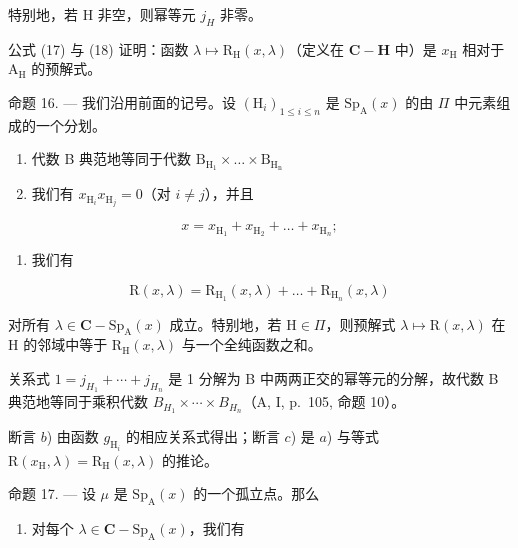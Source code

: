 特别地，若 H 非空，则幂等元 \(j_{H}\) 非零。

公式 (17) 与 (18) 证明：函数 \(\lambda \mapsto \mathrm{R}_{\mathrm{H}}(x,\lambda)\)（定义在 \(\mathbf{C} - \mathbf{H}\) 中）是 \(x_{\mathrm{H}}\) 相对于 \(\mathrm{A_H}\) 的预解式。

命题 16. --- 我们沿用前面的记号。设 \((\mathrm{H}_{i})_{1\leqslant i\leqslant n}\) 是 \(\mathrm{Sp}_{\mathrm{A}}(x)\) 的由 \(\Pi\) 中元素组成的一个分划。

\begin{enumerate}
\def\labelenumi{\alph{enumi})}
\item
  代数 B 典范地等同于代数 \(\mathrm{B_{H_1}}\times \dots \times \mathrm{B_{H_n}}\)
\item
  我们有 \(x_{\mathrm{H}_i}x_{\mathrm{H}_j} = 0\)（对 \(i\neq j\)），并且
\end{enumerate}

\[
x = x _ {\mathrm{H} _ {1}} + x _ {\mathrm{H} _ {2}} + \dots + x _ {\mathrm{H} _ {n}};
\]

\begin{enumerate}
\def\labelenumi{\alph{enumi})}
\setcounter{enumi}{2}
\tightlist
\item
  我们有
\end{enumerate}

\[
\mathrm{R} (x, \lambda) = \mathrm{R} _ {\mathrm{H} _ {1}} (x, \lambda) + \dots + \mathrm{R} _ {\mathrm{H} _ {n}} (x, \lambda)\tag{19}
\]

对所有 \(\lambda\in\mathbf{C}-\mathrm{Sp}_{\mathrm{A}}(x)\) 成立。特别地，若 \(\mathrm{H}\in\Pi\)，则预解式 \(\lambda\mapsto\mathrm{R}(x,\lambda)\) 在 \(\mathrm{H}\) 的邻域中等于 \(\mathrm{R}_{\mathrm{H}}(x,\lambda)\) 与一个全纯函数之和。

关系式 \(1 = j_{H_{1}} + \cdots + j_{H_{n}}\) 是 1 分解为 B 中两两正交的幂等元的分解，故代数 B 典范地等同于乘积代数 \(B_{H_{1}} \times \cdots \times B_{H_{n}}\)（A, I, p.~105, 命题 10）。

断言 \(b\)) 由函数 \(g_{\mathrm{H}_i}\) 的相应关系式得出；断言 \(c\)) 是 \(a\)) 与等式 \(\mathrm{R}(x_{\mathrm{H}},\lambda) = \mathrm{R}_{\mathrm{H}}(x,\lambda)\) 的推论。

命题 17. --- 设 \(\mu\) 是 \(\mathrm{Sp}_{\mathrm{A}}(x)\) 的一个孤立点。那么

\begin{enumerate}
\def\labelenumi{\alph{enumi})}
\tightlist
\item
  对每个 \(\lambda \in \mathbf{C} - \mathrm{Sp}_{\mathrm{A}}(x)\)，我们有
\end{enumerate}

